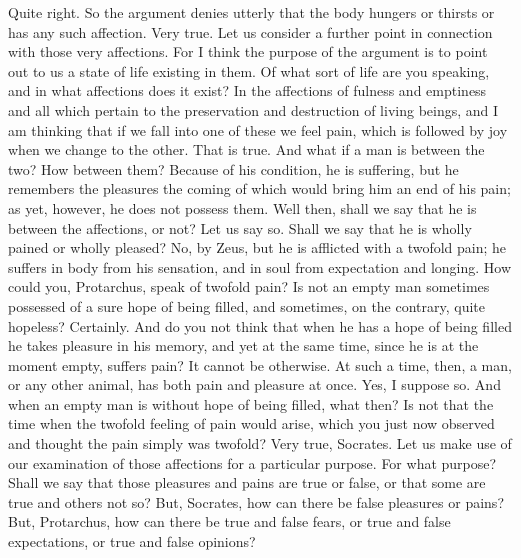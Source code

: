\documentclass[letterpaper,12pt]{article}
\newcommand{\stephpag}[1]{\marginnote{\small\itshape\fontfamily{ppl}\selectfont #1}}
\begin{document}
\begin{drama}
\protarchusspeaks
Quite right.
\socratesspeaks
So the argument denies utterly that the body hungers or thirsts or has any such affection.
\protarchusspeaks
Very true.
\socratesspeaks
Let us consider a further point in connection with those very affections. For I think the purpose of the argument is to point out to us a state of life existing in them. \stephpag{e}
\protarchusspeaks
Of what sort of life are you speaking, and in what affections does it exist?
\socratesspeaks
In the affections of fulness and emptiness and all which pertain to the preservation and destruction of living beings, and I am thinking that if we fall into one of these we feel pain, which is followed by joy when we change to the other.
\protarchusspeaks
That is true.
\socratesspeaks
And what if a man is between the two?
\protarchusspeaks
How between them?
\socratesspeaks
Because of his condition, he is suffering, but he remembers the pleasures the coming of which would bring him an end of his pain; as yet, however, he does not possess them. Well then, shall we say that he is \stephpag{36 a} between the affections, or not?
\protarchusspeaks
Let us say so.
\socratesspeaks
Shall we say that he is wholly pained or wholly pleased?
\protarchusspeaks
No, by Zeus, but he is afflicted with a twofold pain; he suffers in body from his sensation, and in soul from expectation and longing.
\socratesspeaks
How could you, Protarchus, speak of twofold pain? Is not an empty man sometimes possessed \stephpag{b} of a sure hope of being filled, and sometimes, on the contrary, quite hopeless?
\protarchusspeaks
Certainly.
\socratesspeaks
And do you not think that when he has a hope of being filled he takes pleasure in his memory, and yet at the same time, since he is at the moment empty, suffers pain?
\protarchusspeaks
It cannot be otherwise.
\socratesspeaks
At such a time, then, a man, or any other animal, has both pain and pleasure at once.
\protarchusspeaks
Yes, I suppose so.
\socratesspeaks
And when an empty man is without hope of being filled, what then? Is not that the time when the twofold feeling of pain would arise, which you just now observed \stephpag{c} and thought the pain simply was twofold?
\protarchusspeaks
Very true, Socrates.
\socratesspeaks
Let us make use of our examination of those affections for a particular purpose.
\protarchusspeaks
For what purpose?
\socratesspeaks
Shall we say that those pleasures and pains are true or false, or that some are true and others not so?
\protarchusspeaks
But, Socrates, how can there be false pleasures or pains?
\socratesspeaks
But, Protarchus, how can there be true and false fears, or true and false expectations, or true and false opinions? \stephpag{d}

\end{drama}
\end{document}

